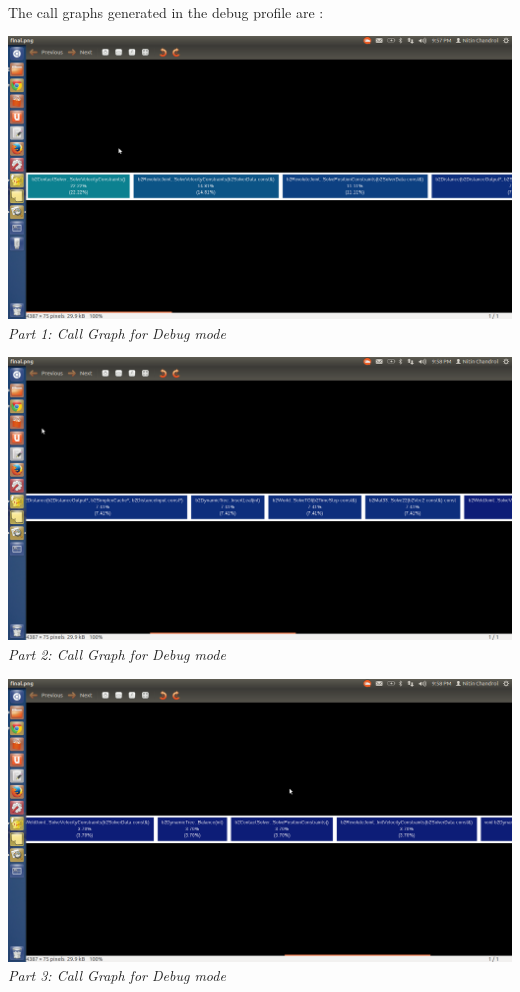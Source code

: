 \documentclass[11pt]{article}
\begin{document}
\paragraph{}
The call graphs generated in the debug profile are :

\begin{center}
 \includegraphics[scale = 0.35]{images/s1} \\
  \emph{Part 1: Call Graph for Debug mode} \\
\end{center}

\begin{center}
 \includegraphics[scale = 0.35]{images/s2} \\
  \emph{Part 2: Call Graph for Debug mode} \\
\end{center}

\begin{center}
 \includegraphics[scale = 0.35]{images/s3} \\
  \emph{Part 3: Call Graph for Debug mode} \\
\end{center}
\end{document}
